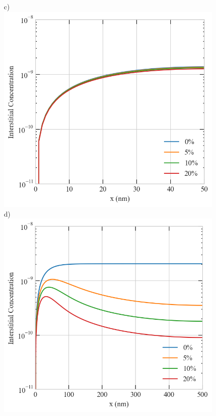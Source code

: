 \documentclass[utf8]{frontiersSCNS} %
\begin{document}
\begin{figure}[h!]
        c)\includegraphics[scale=0.55]{srrt/plots/Fig13_c.png}
        d)\includegraphics[scale=0.55]{srrt/plots/Fig13_d.png}
        \\

\end{figure}
\end{document}
